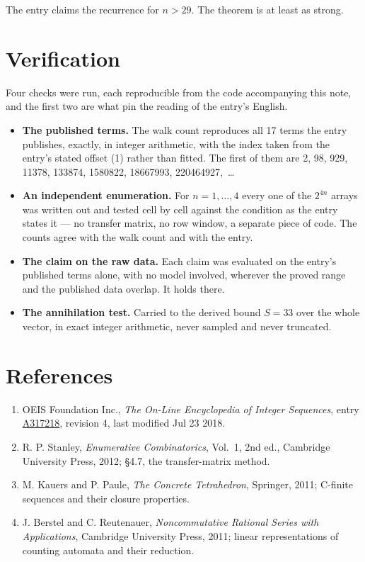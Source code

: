 \documentclass[11pt]{article}
\theoremstyle{definition}
\begin{document}
The entry claims the recurrence for $n > 29$. The theorem is at least as strong.

\section{Verification}

Four checks were run, each reproducible from the code accompanying this note, and the first two are what pin the reading of the entry's English.

\begin{itemize}

\item {\bfseries The published terms.} The walk count reproduces all 17 terms the entry publishes, exactly, in integer arithmetic, with the index taken from the entry's stated offset (1) rather than fitted. The first of them are 2, 98, 929, 11378, 133874, 1580822, 18667993, 220464927,~\dots

\item {\bfseries An independent enumeration.} For $n = 1,\dots,4$ every one of the $2^{4n}$ arrays was written out and tested cell by cell against the condition as the entry states it --- no transfer matrix, no row window, a separate piece of code. The counts agree with the walk count and with the entry.

\item {\bfseries The claim on the raw data.} Each claim was evaluated on the entry's published terms alone, with no model involved, wherever the proved range and the published data overlap. It holds there.

\item {\bfseries The annihilation test.} Carried to the derived bound $S = 33$ over the whole vector, in exact integer arithmetic, never sampled and never truncated.

\end{itemize}

\section{References}

\begin{enumerate}

\item OEIS Foundation Inc., \emph{The On-Line Encyclopedia of Integer Sequences}, entry \href{https://oeis.org/A317218}{A317218}, revision 4, last modified Jul 23 2018.

\item R. P. Stanley, \emph{Enumerative Combinatorics}, Vol.~1, 2nd ed., Cambridge University Press, 2012; \S4.7, the transfer-matrix method.

\item M. Kauers and P. Paule, \emph{The Concrete Tetrahedron}, Springer, 2011; C-finite sequences and their closure properties.

\item J. Berstel and C. Reutenauer, \emph{Noncommutative Rational Series with Applications}, Cambridge University Press, 2011; linear representations of counting automata and their reduction.

\end{enumerate}
\end{document}
